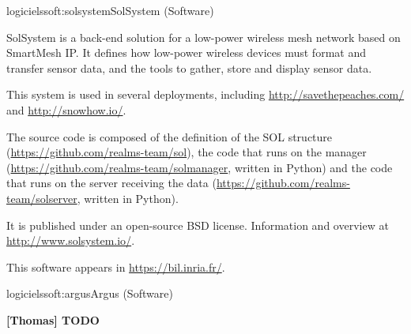 \documentclass{ra2016}
\newcommand{\commentthomas}[1] {\textbf{[Thomas] #1}}
\begin{document}
\begin{module}{logiciels}{soft:solsystem}{SolSystem (Software)}

\begin{participants}
\end{participants}

SolSystem is a back-end solution for a low-power wireless mesh network based on SmartMesh IP.
It defines how low-power wireless devices must format and transfer sensor data, and the tools to gather, store and display sensor data.

This system is used in several deployments, including \url{http://savethepeaches.com/} and \url{http://snowhow.io/}.

The source code is composed of the definition of
the SOL structure (\url{https://github.com/realms-team/sol}),
the code that runs on the manager (\url{https://github.com/realms-team/solmanager}, written in Python) and
the code that runs on the server receiving the data (\url{https://github.com/realms-team/solserver}, written in Python).

It is published under an open-source BSD license. Information and overview at \url{http://www.solsystem.io/}.

This software appears in \url{https://bil.inria.fr/}.

\end{module}

\begin{module}{logiciels}{soft:argus}{Argus (Software)}

\commentthomas{TODO}

\end{module}
\end{document}
